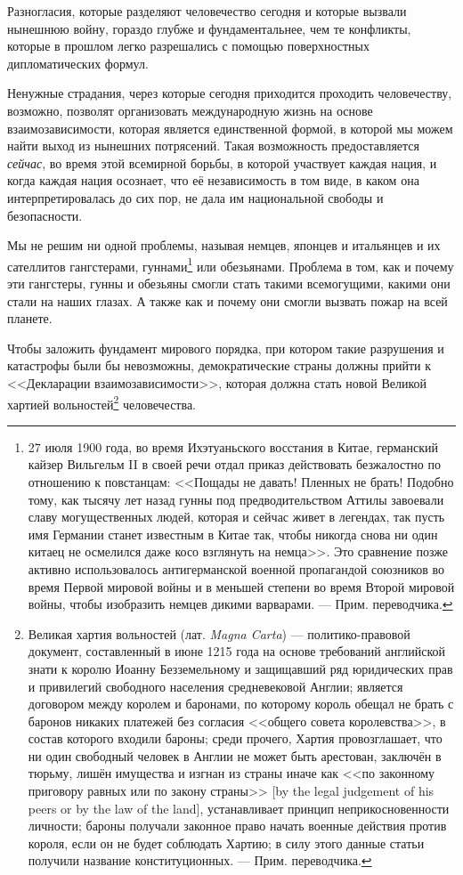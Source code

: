 Разногласия, которые разделяют человечество сегодня и которые вызвали нынешнюю войну, гораздо глубже и фундаментальнее, чем те конфликты, которые в прошлом легко разрешались с помощью поверхностных дипломатических формул.

Ненужные страдания, через которые сегодня приходится проходить человечеству, возможно, позволят организовать международную жизнь на основе взаимозависимости, которая является единственной формой, в которой мы можем найти выход из нынешних потрясений. Такая возможность предоставляется \textit{сейчас}, во время этой всемирной борьбы, в которой участвует каждая нация, и когда каждая нация осознает, что её независимость в том виде, в каком она интерпретировалась до сих пор, не дала им национальной свободы и безопасности.

Мы не решим ни одной проблемы, называя немцев, японцев и итальянцев и их сателлитов гангстерами, гуннами\footnote{%
27 июля 1900 года, во время Ихэтуаньского восстания в Китае, германский кайзер Вильгельм II в своей речи отдал приказ действовать безжалостно по отношению к повстанцам: <<Пощады не давать! Пленных не брать! Подобно тому, как тысячу лет назад гунны под предводительством Аттилы завоевали славу могущественных людей, которая и сейчас живет в легендах, так пусть имя Германии станет известным в Китае так, чтобы никогда снова ни один китаец не осмелился даже косо взглянуть на немца>>. Это сравнение позже активно использовалось антигерманской военной пропагандой союзников во время Первой мировой войны и в меньшей степени во время Второй мировой войны, чтобы изобразить немцев дикими варварами. — Прим. переводчика.} или обезьянами. Проблема в том, как и почему эти гангстеры, гунны и обезьяны смогли стать такими всемогущими, какими они стали на наших глазах. А также как и почему они смогли вызвать пожар на всей планете.

Чтобы заложить фундамент мирового порядка, при котором такие разрушения и катастрофы были бы невозможны, демократические страны должны прийти к <<Декларации взаимозависимости>>, которая должна стать новой Великой хартией вольностей\footnote{%
Великая хартия вольностей (лат. \textit{Magna Carta}) — политико-правовой документ, составленный в июне 1215 года на основе требований английской знати к королю Иоанну Безземельному и защищавший ряд юридических прав и привилегий свободного населения средневековой Англии; является договором между королем и баронами, по которому король обещал не брать с баронов никаких платежей без согласия <<общего совета королевства>>, в состав которого входили бароны; среди прочего, Хартия провозглашает, что ни один свободный человек в Англии не может быть арестован, заключён в тюрьму, лишён имущества и изгнан из страны иначе как <<по законному приговору равных или по закону страны>> [by the legal judgement of his peers or by the law of the land], устанавливает принцип неприкосновенности личности; бароны получали законное право начать военные действия против короля, если он не будет соблюдать Хартию; в силу этого данные статьи получили название конституционных.  — Прим. переводчика.} человечества.

